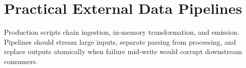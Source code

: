 \section{Practical External Data Pipelines}

Production scripts chain ingestion, in-memory transformation, and emission. Pipelines should stream large inputs, separate parsing from processing, and replace outputs atomically when failure mid-write would corrupt downstream consumers.
